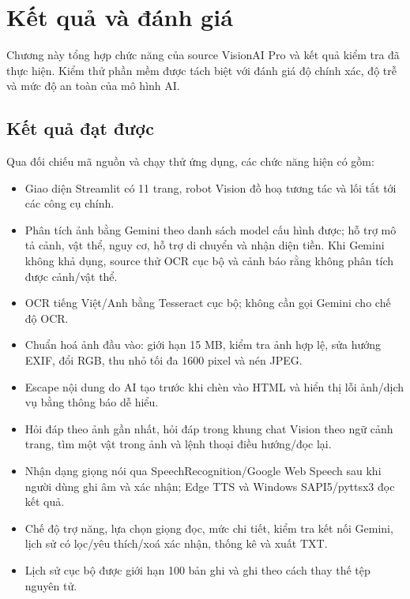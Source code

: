 \chapter{Kết quả và đánh giá}
\label{ch:ketqua}

\begin{muctieu}
Chương này tổng hợp chức năng của source VisionAI Pro và kết quả kiểm tra
đã thực hiện. Kiểm thử phần mềm được tách biệt với đánh giá độ chính xác,
độ trễ và mức độ an toàn của mô hình AI.
\end{muctieu}

\section{Kết quả đạt được}

Qua đối chiếu mã nguồn và chạy thử ứng dụng, các chức năng hiện có gồm:
\begin{itemize}[leftmargin=1.6em, itemsep=2pt]
  \item Giao diện Streamlit có 11 trang, robot Vision đồ hoạ tương tác và lối tắt tới các công cụ chính.
  \item Phân tích ảnh bằng Gemini theo danh sách model cấu hình được; hỗ trợ mô tả cảnh, vật thể, nguy cơ, hỗ trợ di chuyển và nhận diện tiền. Khi Gemini không khả dụng, source thử OCR cục bộ và cảnh báo rằng không phân tích được cảnh/vật thể.
  \item OCR tiếng Việt/Anh bằng Tesseract cục bộ; không cần gọi Gemini cho chế độ OCR.
  \item Chuẩn hoá ảnh đầu vào: giới hạn 15 MB, kiểm tra ảnh hợp lệ, sửa hướng EXIF, đổi RGB, thu nhỏ tối đa 1600 pixel và nén JPEG.
  \item Escape nội dung do AI tạo trước khi chèn vào HTML và hiển thị lỗi ảnh/dịch vụ bằng thông báo dễ hiểu.
  \item Hỏi đáp theo ảnh gần nhất, hỏi đáp trong khung chat Vision theo ngữ cảnh trang, tìm một vật trong ảnh và lệnh thoại điều hướng/đọc lại.
  \item Nhận dạng giọng nói qua SpeechRecognition/Google Web Speech sau khi người dùng ghi âm và xác nhận; Edge TTS và Windows SAPI5/pyttsx3 đọc kết quả.
  \item Chế độ trợ năng, lựa chọn giọng đọc, mức chi tiết, kiểm tra kết nối Gemini, lịch sử có lọc/yêu thích/xoá xác nhận, thống kê và xuất TXT.
  \item Lịch sử cục bộ được giới hạn 100 bản ghi và ghi theo cách thay thế tệp nguyên tử.
\end{itemize}

